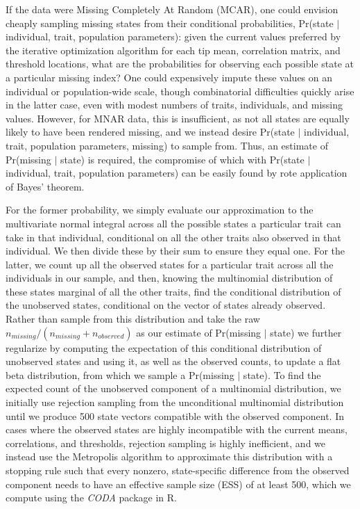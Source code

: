 \documentclass[10pt, twocolumn, twoside]{article}
\begin{document}
If the data were Missing Completely At Random (MCAR), one could envision cheaply sampling missing states from their conditional probabilities, Pr(state $\vert$ individual, trait, population parameters): given the current values preferred by the iterative optimization algorithm for each tip mean, correlation matrix, and threshold locations, what are the probabilities for observing each possible state at a particular missing index? One could expensively impute these values on an individual or population-wide scale, though combinatorial difficulties quickly arise in the latter case, even with modest numbers of traits, individuals, and missing values. However, for MNAR data, this is insufficient, as not all states are equally likely to have been rendered missing, and we instead desire Pr(state $\vert$ individual, trait, population parameters, missing) to sample from. Thus, an estimate of Pr(missing $\vert$ state) is required, the compromise of which with Pr(state $\vert$ individual, trait, population parameters) can be easily found by rote application of Bayes' theorem.

For the former probability, we simply evaluate our approximation to the multivariate normal integral across all the possible states a particular trait can take in that individual, conditional on all the other traits also observed in that individual. We then divide these by their sum to ensure they equal one. For the latter, we count up all the observed states for a particular trait across all the individuals in our sample, and then, knowing the multinomial distribution of these states marginal of all the other traits, find the conditional distribution of the unobserved states, conditional on the vector of states already observed. Rather than sample from this distribution and take the raw $n_{missing} / (n_{missing} + n_{observed})$ as our estimate of Pr(missing $\vert$ state) we further regularize by computing the expectation of this conditional distribution of unobserved states and using it, as well as the observed counts, to update a flat beta distribution, from which we sample a Pr(missing $\vert$ state). To find the expected count of the unobserved component of a multinomial distribution, we initially use rejection sampling from the unconditional multinomial distribution until we produce 500 state vectors compatible with the observed component. In cases where the observed states are highly incompatible with the current means, correlations, and thresholds, rejection sampling is highly inefficient, and we instead use the Metropolis algorithm to approximate this distribution with a stopping rule such that every nonzero, state-specific difference from the observed component needs to have an effective sample size (ESS) of at least 500, which we compute using the \textit{CODA} package \citep{plummerCODAConvergenceDiagnosis2006} in R.
\end{document}

